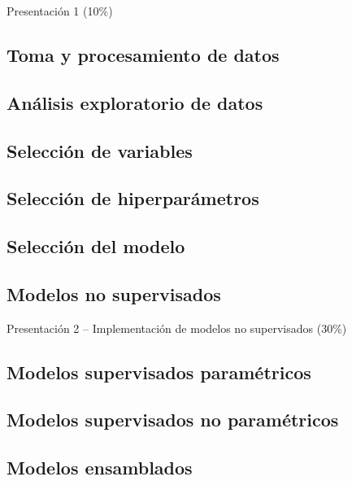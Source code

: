 \documentclass[a4paper,twoside,11pt,]{article}
\begin{document}
\begin{tcolorbox}[enhanced,width=5in,center upper,  fontupper=\large\bfseries,drop shadow southwest,sharp corners]
Presentación 1 (10\%)
\end{tcolorbox}

\subsection {Toma y procesamiento de datos}

\subsection {Análisis exploratorio de datos}

\subsection {Selección de variables}

\subsection {Selección de hiperparámetros}

\subsection {Selección del modelo}

\subsection {Modelos no supervisados}

\begin{tcolorbox}[enhanced,width=5in,center upper,  fontupper=\large\bfseries,drop shadow southwest,sharp corners]
Presentación 2 -- Implementación de modelos no supervisados (30\%)
\end{tcolorbox}

\subsection {Modelos supervisados paramétricos}

\subsection {Modelos supervisados no paramétricos}

\subsection {Modelos ensamblados}
\end{document}
